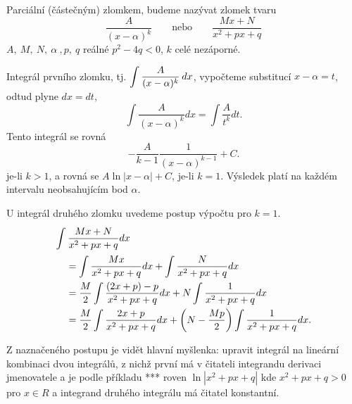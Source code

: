       \begin{definition} Parciální (částečným) zlomkem, budeme nazývat zlomek tvaru
         \begin{equation}
            \frac{A}{(x-\alpha)^k} \qquad\text{nebo}\qquad\frac{Mx + N}{x^2 + px +q}
         \end{equation}  
         $A,\ M,\ N,\ \alpha\ , p,\ q$ reálné $p^2-4q < 0$, $k$ celé nezáporné.         
      \end{definition}
      
      Integrál prvního zlomku, tj. $\displaystyle{\int\frac{A}{(x-\alpha)^k}\hspace{2pt}dx}$, vypočteme 
      substitucí $x-\alpha=t$, odtud plyne $dx = dt$,
      \begin{equation}\label{MA:int_ex_14}
        \int\frac{A}{(x-\alpha)^k}dx = \int\frac{A}{t^k}dt.
      \end{equation}
      Tento integrál se rovná
      \begin{equation}\label{MA:int_ex_16}
        -\frac{A}{k-1}\frac{1}{(x-\alpha)^{k-1}} + C.
      \end{equation}        
      je-li $k>1$, a rovná se $A\ln|x-\alpha| + C$, je-li $k = 1$. Výsledek platí na každém
      intervalu neobsahujícím bod $\alpha$.
      
       U integrál druhého zlomku uvedeme postup výpočtu pro $k = 1$. 
      \begin{align*}
         \intertext{\(\displaystyle\int{\frac{Mx + N}{x^2+px+q}dx}\)}
           \quad &=  \int{\frac{Mx}{x^2+px+q}dx} + \int{\frac{N}{x^2+px+q}dx}                     
           \\  
           \quad &=  \frac{M}{2}\int{\frac{(2x + p) - p}{x^2+px+q}dx} + 
                     N\int{\frac{1}{x^2+px+q}dx}                                                   \\ 
           \quad &=  \frac{M}{2}\int{\frac{2x + p}{x^2+px+q}dx} + 
                      \left(N-\frac{Mp}{2}\right)\int{\frac{1}{x^2+px+q}dx.}                   
      \end{align*}  
      
      Z naznačeného postupu je vidět hlavní myšlenka: upravit integrál na lineární kombinaci dvou 
      integrálů, z nichž první má v čitateli integrandu derivaci jmenovatele a je podle příkladu 
      *** roven $\ln|x^2+px+q|$ kde $x^2+px+q >0$ pro $x\in R$ a integrand druhého integrálu má 
      čitatel konstantní.
      

